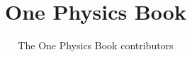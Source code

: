 \documentclass[11pt,a4paper,twoside,openany]{book}
\title{One Physics Book}
\author{The One Physics Book contributors}
\date{\bookdate}
\begin{document}
\frontmatter



\tableofcontents

\mainmatter





\appendix
\part{\omsolutionspart}




\backmatter
\printindex
\end{document}
